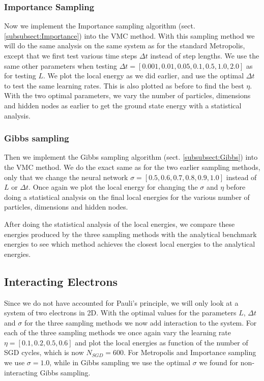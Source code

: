\documentclass[12pt,a4paper,english]{article}
\begin{document}
\subsubsection{Importance Sampling}
\label{subsubsect:Method_Nonint_Importance}
Now we implement the Importance sampling algorithm (sect. \ref{subsubsect:Importance}) into the VMC method. With this sampling method we will do the same analysis on the same system as for the standard Metropolis, except that we first test various time steps $\Delta t$ instead of step lengths. We use the same other parameters when testing $\Delta t=[0.001,0.01,0.05,0.1,0.5,1.0,2.0]$ as for testing $L$. We plot the local energy as we did earlier, and use the optimal $\Delta t$ to test the same learning rates. This is also plotted as before to find the best $\eta$. With the two optimal parameters, we vary the number of particles, dimensions and hidden nodes as earlier to get the ground state energy with a statistical analysis.

\subsubsection{Gibbs sampling}
\label{subsubsect:Method_Nonint_Gibbs}
Then we implement the Gibbs sampling algorithm (sect. \ref{subsubsect:Gibbs}) into the VMC method. We do the exact same as for the two earlier sampling methods, only that we change the neural network $\sigma=[0.5, 0.6, 0.7, 0.8, 0.9, 1.0]$ instead of $L$ or $\Delta t$. Once again we plot the local energy for changing the $\sigma$ and $\eta$ before doing a statistical analysis on the final local energies for the various number of particles, dimensions and hidden nodes.

After doing the statistical analysis of the local energies, we compare these energies produced by the three sampling methods with the analytical benchmark energies to see which method achieves the closest local energies to the analytical energies.

\subsection{Interacting Electrons}
\label{subsect:Method_int}
Since we do not have accounted for Pauli's principle, we will only look at a system of two electrons in 2D. With the optimal values for the parameters $L$, $\Delta t$ and $\sigma$ for the three sampling methods we now add interaction to the system. For each of the three sampling methods we once again vary the learning rate $\eta=[0.1,0.2,0.5,0.6]$ and plot the local energies as function of the number of SGD cycles, which is now $N_{SGD}=600$. For Metropolis and Importance sampling we use $\sigma=1.0$, while in Gibbs sampling we use the optimal $\sigma$ we found for non-interacting Gibbs sampling.
\end{document}

